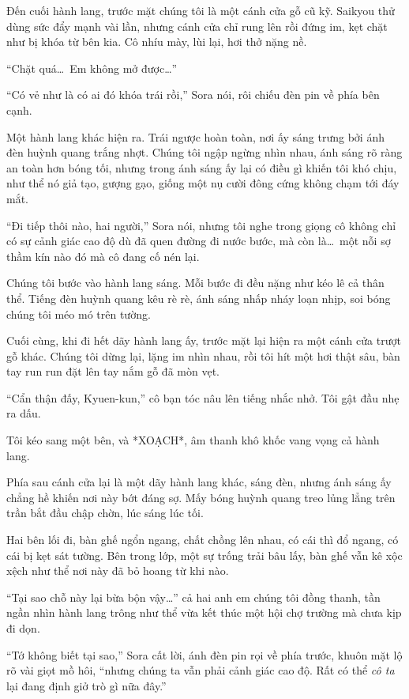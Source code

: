 \documentclass[../main.tex]{subfiles}
\begin{document}
Đến cuối hành lang, trước mặt chúng tôi là một cánh cửa gỗ cũ kỹ. Saikyou thử dùng sức đẩy mạnh vài lần, nhưng cánh cửa chỉ rung lên rồi đứng im, kẹt chặt như bị khóa từ bên kia. Cô nhíu mày, lùi lại, hơi thở nặng nề.

``Chặt quá\dots\ Em không mở được\dots''

``Có vẻ như là có ai đó khóa trái rồi,'' Sora nói, rôi chiếu đèn pin về phía bên cạnh.

Một hành lang khác hiện ra. Trái ngược hoàn toàn, nơi ấy sáng trưng bởi ánh đèn huỳnh quang trắng nhợt. Chúng tôi ngập ngừng nhìn nhau, ánh sáng rõ ràng an toàn hơn bóng tối, nhưng trong ánh sáng ấy lại có điều gì khiến tôi khó chịu, như thể nó giả tạo, gượng gạo, giống một nụ cười đông cứng không chạm tới đáy mắt.

``Đi tiếp thôi nào, hai người,'' Sora nói, nhưng tôi nghe trong giọng cô không chỉ có sự cảnh giác cao độ dù đã quen đường đi nước bước, mà còn là\dots\ một nỗi sợ thầm kín nào đó mà cô đang cố nén lại.

Chúng tôi bước vào hành lang sáng. Mỗi bước đi đều nặng như kéo lê cả thân thể. Tiếng đèn huỳnh quang kêu rè rè, ánh sáng nhấp nháy loạn nhịp, soi bóng chúng tôi méo mó trên tường.

Cuối cùng, khi đi hết dãy hành lang ấy, trước mặt lại hiện ra một cánh cửa trượt gỗ khác. Chúng tôi dừng lại, lặng im nhìn nhau, rồi tôi hít một hơi thật sâu, bàn tay run run đặt lên tay nắm gỗ đã mòn vẹt.

``Cẩn thận đấy, Kyuen-kun,'' cô bạn tóc nâu lên tiếng nhắc nhở. Tôi gật đầu nhẹ ra dấu.

Tôi kéo sang một bên, và *XOẠCH*, âm thanh khô khốc vang vọng cả hành lang.

Phía sau cánh cửa lại là một dãy hành lang khác, sáng đèn, nhưng ánh sáng ấy chẳng hề khiến nơi này bớt đáng sợ. Mấy bóng huỳnh quang treo lủng lẳng trên trần bắt đầu chập chờn, lúc sáng lúc tối.

Hai bên lối đi, bàn ghế ngổn ngang, chất chồng lên nhau, có cái thì đổ ngang, có cái bị kẹt sát tường. Bên trong lớp, một sự trống trải bâu lấy, bàn ghế vẫn kê xộc xệch như thể nơi này đã bỏ hoang từ khi nào.

``Tại sao chỗ này lại bừa bộn vậy\dots'' cả hai anh em chúng tôi đồng thanh, tần ngần nhìn hành lang trông như thể vừa kết thúc một hội chợ trường mà chưa kịp đi dọn.

``Tớ không biết tại sao,'' Sora cất lời, ánh đèn pin rọi về phía trước, khuôn mặt lộ rõ vài giọt mồ hôi, ``nhưng chúng ta vẫn phải cảnh giác cao độ. Rất có thể \emph{cô ta} lại đang định giở trò gì nữa đây.''
\end{document}
